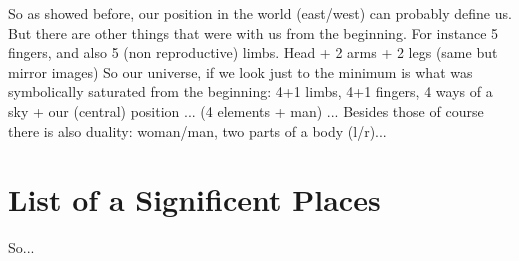 \documentclass{book}
\begin{document}
So as showed before, our position in the world (east/west) can probably define us. But there are other things that were with us from the beginning. For instance 5 fingers, and also 5 (non reproductive) limbs. Head + 2 arms + 2 legs (same but mirror images)
So our universe, if we look just to the minimum is what was symbolically saturated from the beginning: 4+1 limbs, 4+1 fingers, 4 ways of a sky + our (central) position ... (4 elements + man) ... Besides those of course there is also duality: woman/man, two parts of a body (l/r)...

\chapter{List of a Significent Places}

So...
\end{document}
